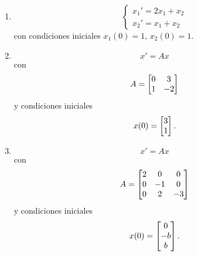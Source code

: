 \begin{enumerate}
 \item
 $$
\begin{cases}
 x_{1}'=2x_{1}+x_{2} \\
 x_{2}'=x_{1} + x_{2}
\end{cases}
 $$
con condiciones iniciales $x_{1}(0)=1, \, x_{2}(0)=1.$

\item
$$x'=Ax$$ con
$$
A=\begin{bmatrix}0 & 3 \\ 1 & -2\end{bmatrix}
$$
y condiciones iniciales
$$
x(0)=\begin{bmatrix}3 \\ 1\end{bmatrix}.
$$

\item
$$
x'=Ax
$$
con
$$
A=\begin{bmatrix}2&0&0\\0&-1&0\\0&2&-3\end{bmatrix}
$$
y condiciones iniciales
$$
x(0)=\begin{bmatrix}0\\-b\\b\end{bmatrix}.
$$
\end{enumerate}

